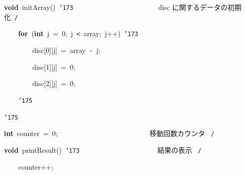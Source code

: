 \documentclass[a4paper,10pt]{article}
\def\mc{\relax}
\begin{document}
\noindent
\mbox{}\hfill

\noindent
\mbox{}\textbf{void}{\tt\mc \ }initArray(){\tt\mc \ }{\tt\char'173}{\tt\mc \ }{\tt\mc \ }{\tt\mc \ }{\tt\mc \ }{\tt\mc \ }{\tt\mc \ }{\tt\mc \ }{\tt\mc \ }{\tt\mc \ }{\tt\mc \ }{\tt\mc \ }{\tt\mc \ }{\tt\mc \ }{\tt\mc \ }{\tt\mc \ }{\tt\mc \ }{\tt\mc \ }{\tt\mc \ }{\tt\mc \ }{\tt\mc \ }{\tt\mc \ }{\tt\mc \ }\rm\mc {\tt /}{\tt *}\  \ disc に関するデータの初期化\hfill \rm\mc \ {\tt *}{\tt /}
\tt\mc 

\noindent
\mbox{}{\tt\mc \ }{\tt\mc \ }{\tt\mc \ }{\tt\mc \ }\textbf{for}{\tt\mc \ }(\textbf{int}{\tt\mc \ }j{\tt\mc \ }={\tt\mc \ }0;{\tt\mc \ }j{\tt\mc \ }{\tt <}{\tt\mc \ }array;{\tt\mc \ }j++){\tt\mc \ }{\tt\char'173}

\noindent
\mbox{}{\tt\mc \ }{\tt\mc \ }{\tt\mc \ }{\tt\mc \ }{\tt\mc \ }{\tt\mc \ }{\tt\mc \ }{\tt\mc \ }disc[0][j]{\tt\mc \ }={\tt\mc \ }array{\tt\mc \ }{\tt -}{\tt\mc \ }j;

\noindent
\mbox{}{\tt\mc \ }{\tt\mc \ }{\tt\mc \ }{\tt\mc \ }{\tt\mc \ }{\tt\mc \ }{\tt\mc \ }{\tt\mc \ }disc[1][j]{\tt\mc \ }={\tt\mc \ }0;

\noindent
\mbox{}{\tt\mc \ }{\tt\mc \ }{\tt\mc \ }{\tt\mc \ }{\tt\mc \ }{\tt\mc \ }{\tt\mc \ }{\tt\mc \ }disc[2][j]{\tt\mc \ }={\tt\mc \ }0;

\noindent
\mbox{}{\tt\mc \ }{\tt\mc \ }{\tt\mc \ }{\tt\mc \ }{\tt\char'175}

\noindent
\mbox{}{\tt\char'175}

\noindent
\mbox{}\hfill

\noindent
\mbox{}\textbf{int}{\tt\mc \ }counter{\tt\mc \ }={\tt\mc \ }0;{\tt\mc \ }{\tt\mc \ }{\tt\mc \ }{\tt\mc \ }{\tt\mc \ }{\tt\mc \ }{\tt\mc \ }{\tt\mc \ }{\tt\mc \ }{\tt\mc \ }{\tt\mc \ }{\tt\mc \ }{\tt\mc \ }{\tt\mc \ }{\tt\mc \ }{\tt\mc \ }{\tt\mc \ }{\tt\mc \ }{\tt\mc \ }{\tt\mc \ }{\tt\mc \ }{\tt\mc \ }{\tt\mc \ }{\tt\mc \ }\rm\mc {\tt /}{\tt *}\  \ 移動回数カウンタ \hfill \rm\mc \ {\tt *}{\tt /}
\tt\mc 

\noindent
\mbox{}\hfill

\noindent
\mbox{}\textbf{void}{\tt\mc \ }printResult(){\tt\mc \ }{\tt\char'173}{\tt\mc \ }{\tt\mc \ }{\tt\mc \ }{\tt\mc \ }{\tt\mc \ }{\tt\mc \ }{\tt\mc \ }{\tt\mc \ }{\tt\mc \ }{\tt\mc \ }{\tt\mc \ }{\tt\mc \ }{\tt\mc \ }{\tt\mc \ }{\tt\mc \ }{\tt\mc \ }{\tt\mc \ }{\tt\mc \ }{\tt\mc \ }{\tt\mc \ }\rm\mc {\tt /}{\tt *}\  \ 結果の表示 \hfill \rm\mc \ {\tt *}{\tt /}
\tt\mc 

\noindent
\mbox{}{\tt\mc \ }{\tt\mc \ }{\tt\mc \ }{\tt\mc \ }counter++;
\end{document}

